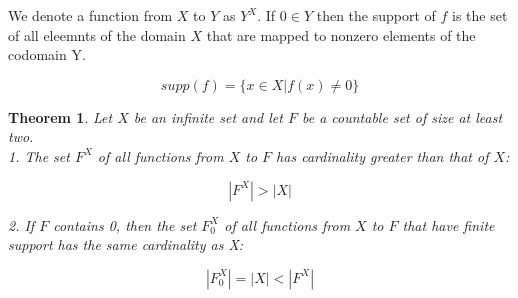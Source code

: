 \documentclass [12pt]{article}
\newtheorem {theorem}{Theorem}
\begin{document}
We denote a function from $X$ to $Y$ as $Y^{X}$. If $0\in Y$ then the support
of $f$ is the set of all eleemnts of the domain $X$ that are mapped to nonzero
elements of the codomain Y. 

\[supp(f)=\{x\in X|f(x)\neq 0\} \]
 

\begin {theorem}
 Let $X$ be an infinite set and let $F$ be a countable set of size at least
two.\\
1. The set $F^X$ of all functions from $X$ to $F$ has cardinality greater
than that of $X$: 

\[|F^X|>|X| \]
 

2. If $F$ contains 0, then the set $F_{0}^X$ of all functions from $X$ to
$F$ that have finite support has the same cardinality as X: 

\[|F_{0}^X|=|X|<|F^X| \]
 
\end {theorem}
\end{document}
